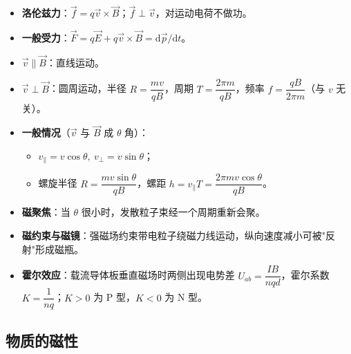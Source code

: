 \documentclass[12pt,a4paper]{ctexart}
\begin{document}
\begin{itemize}
    \item \textbf{洛伦兹力}：$\vec f=q\vec v\times\vec B$；$\vec f\perp\vec v$，对运动电荷不做功。
    \item \textbf{一般受力}：$\vec F=q\vec E+q\vec v\times\vec B=\mathrm d\vec p/\mathrm dt$。
    \item \textbf{$\vec v\parallel\vec B$}：直线运动。
    \item \textbf{$\vec v\perp\vec B$}：圆周运动，半径 $R=\dfrac{mv}{qB}$，周期 $T=\dfrac{2\pi m}{qB}$，频率 $f=\dfrac{qB}{2\pi m}$（与 $v$ 无关）。
    \item \textbf{一般情况}（$\vec v$ 与 $\vec B$ 成 $\theta$ 角）：
    \begin{itemize}
        \item $v_\parallel=v\cos\theta,\ v_\perp=v\sin\theta$；
        \item 螺旋半径 $R=\dfrac{mv\sin\theta}{qB}$，螺距 $h=v_\parallel T=\dfrac{2\pi mv\cos\theta}{qB}$。
    \end{itemize}
    \item \textbf{磁聚焦}：当 $\theta$ 很小时，发散粒子束经一个周期重新会聚。
    \item \textbf{磁约束与磁镜}：强磁场约束带电粒子绕磁力线运动，纵向速度减小可被"反射"形成磁瓶。
    \item \textbf{霍尔效应}：载流导体板垂直磁场时两侧出现电势差 $U_{ab}=\dfrac{IB}{nqd}$，霍尔系数 $K=\dfrac{1}{nq}$；$K>0$ 为 P 型，$K<0$ 为 N 型。
\end{itemize}

\subsection{物质的磁性}
\end{document}
